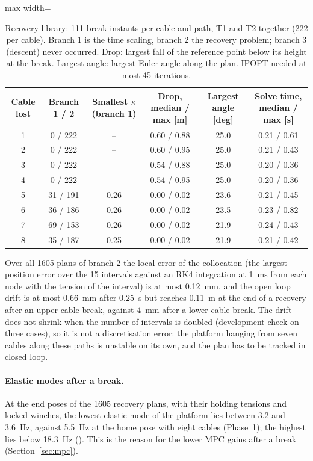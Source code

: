 \documentclass[10pt]{article}
\begin{document}
\begin{table}[h]
\centering\small
\caption{Recovery library: 111 break instants per cable and path, T1 and T2 together (222 per cable). Branch 1 is the time scaling, branch 2 the recovery problem; branch 3 (descent) never occurred. Drop: largest fall of the reference point below its height at the break. Largest angle: largest Euler angle along the plan. IPOPT needed at most 45 iterations.}\label{tab:library}
\begin{adjustbox}{max width=\linewidth}\begin{tabular}{@{}cccccc@{}}
\toprule
Cable lost & Branch 1 / 2 & Smallest $\kappa$ (branch 1) & Drop, median / max [m] & Largest angle [deg] & Solve time, median / max [s] \\
\midrule
1 & 0 / 222 & -- & 0.60 / 0.88 & 25.0 & 0.21 / 0.61 \\
2 & 0 / 222 & -- & 0.60 / 0.95 & 25.0 & 0.21 / 0.43 \\
3 & 0 / 222 & -- & 0.54 / 0.88 & 25.0 & 0.20 / 0.36 \\
4 & 0 / 222 & -- & 0.54 / 0.95 & 25.0 & 0.20 / 0.36 \\
5 & 31 / 191 & 0.26 & 0.00 / 0.02 & 23.6 & 0.21 / 0.45 \\
6 & 36 / 186 & 0.26 & 0.00 / 0.02 & 23.5 & 0.23 / 0.82 \\
7 & 69 / 153 & 0.26 & 0.00 / 0.02 & 21.9 & 0.24 / 0.43 \\
8 & 35 / 187 & 0.25 & 0.00 / 0.02 & 21.9 & 0.21 / 0.42 \\
\bottomrule
\end{tabular}\end{adjustbox}
\end{table}

Over all 1605 plans of branch 2 the local error of the collocation (the largest position error over the 15 intervals against an RK4 integration at 1~ms from each node with the tension of the interval) is at most 0.12~mm, and the open loop drift is at most 0.66~mm after 0.25~s but reaches 0.11~m at the end of a recovery after an upper cable break, against 4~mm after a lower cable break. The drift does not shrink when the number of intervals is doubled (development check on three cases), so it is not a discretisation error: the platform hanging from seven cables along these paths is unstable on its own, and the plan has to be tracked in closed loop.

\paragraph{Elastic modes after a break.} At the end poses of the 1605 recovery plans, with their holding tensions and locked winches, the lowest elastic mode of the platform lies between 3.2 and 3.6~Hz, against 5.5~Hz at the home pose with eight cables (Phase~1); the highest lies below 18.3~Hz (). This is the reason for the lower MPC gains after a break (Section~\ref{sec:mpc}).
\end{document}
